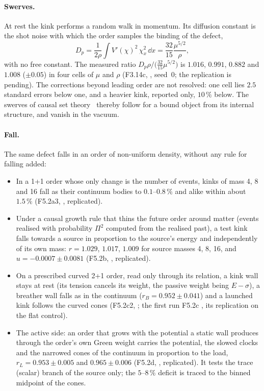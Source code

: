 \paragraph{Swerves.} At rest the kink performs a random walk in momentum. Its diffusion constant is the shot noise
with which the order samples the binding of the defect,
\begin{equation}
  D_p=\frac{1}{2\rho}\int V'(\chi)^2\,\chi_x^2\,\dd x=\frac{32}{15}\frac{\mu^{5/2}}{\rho},
\end{equation}
with no free constant. The measured ratio $D_p\rho/\bigl(\tfrac{32}{15}\mu^{5/2}\bigr)$ is $1.016$, $0.991$,
$0.882$ and $1.008$ ($\pm0.05$) in four cells of $\mu$ and $\rho$ (F3.14c, , seed~0; the
replication is pending). The corrections beyond leading order are not resolved: one cell lies $2.5$ standard errors
below one, and a heavier kink, reported only, $10\,\%$ below. The swerves of
causal set theory~\cite{DowkerHensonSorkin2004} thereby follow for a bound object from its internal structure, and
vanish in the vacuum.

\paragraph{Fall.} The same defect falls in an order of non-uniform density, without any rule for falling added:
\begin{itemize}
\item In a 1+1 order whose only change is the number of events, kinks of mass 4, 8 and 16 fall as their
  continuum bodies to $0.1$--$0.8\,\%$ and alike within about $1.5\,\%$ (F5.2a3, , replicated).
\item Under a causal growth rule that thins the future order around matter (events realised with probability
  $\Pi^2$ computed from the realised past), a test kink falls towards a source in proportion to the source's
  energy and independently of its own mass: $r=1.029$, $1.017$, $1.009$ for source masses 4, 8, 16, and
  $u=-0.0007\pm0.0081$ (F5.2b, , replicated).
\item On a prescribed curved 2+1 order, read only through its relation, a kink wall stays at rest (its tension
  cancels its weight, the passive weight being $E-\sigma$), a breather wall falls as in the continuum
  ($r_B=0.952\pm0.041$) and a launched kink follows the curved cones (F5.2c2, ; the first run
  F5.2c , its replication  on the flat control).
\item The active side: an order that grows with the potential a static wall produces through the order's own
  Green weight carries the potential, the slowed clocks and the narrowed cones of the continuum in proportion to
  the load, $r_L=0.953\pm0.005$ and $0.965\pm0.006$ (F5.2d, , replicated). It tests the
  trace (scalar) branch of the source only; the $5$--$8\,\%$ deficit is traced to the binned midpoint of the cones.
\end{itemize}

